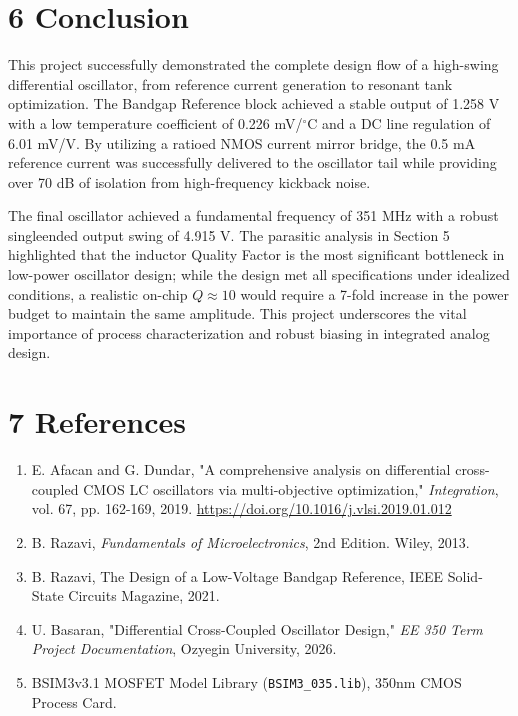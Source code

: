 \documentclass[12pt]{article}
\begin{document}
\section*{6 Conclusion}
This project successfully demonstrated the complete design flow of a high-swing differential oscillator, from reference current generation to resonant tank optimization. The Bandgap Reference block achieved a stable output of 1.258 V with a low temperature coefficient of 0.226 mV/$^\circ$C and a DC line regulation of 6.01 mV/V. By utilizing a ratioed NMOS current mirror bridge, the 0.5 mA reference current was successfully delivered to the oscillator tail while providing over 70 dB of isolation from high-frequency kickback noise.

The final oscillator achieved a fundamental frequency of 351 MHz with a robust singleended output swing of 4.915 V. The parasitic analysis in Section 5 highlighted that the inductor Quality Factor is the most significant bottleneck in low-power oscillator design; while the design met all specifications under idealized conditions, a realistic on-chip $Q \approx 10$ would require a 7-fold increase in the power budget to maintain the same amplitude. This project underscores the vital importance of process characterization and robust biasing in integrated analog design.

\section*{7 References}
\begin{enumerate}
    \item E. Afacan and G. Dundar, "A comprehensive analysis on differential cross-coupled CMOS LC oscillators via multi-objective optimization," \textit{Integration}, vol. 67, pp. 162-169, 2019. \url{https://doi.org/10.1016/j.vlsi.2019.01.012}
    \item B. Razavi, \textit{Fundamentals of Microelectronics}, 2nd Edition. Wiley, 2013.
    \item B. Razavi, The Design of a Low-Voltage Bandgap Reference, IEEE Solid-State Circuits Magazine, 2021.
    \item U. Basaran, "Differential Cross-Coupled Oscillator Design," \textit{EE 350 Term Project Documentation}, Ozyegin University, 2026.
    \item BSIM3v3.1 MOSFET Model Library (\texttt{BSIM3\_035.lib}), 350nm CMOS Process Card.
\end{enumerate}
\end{document}
